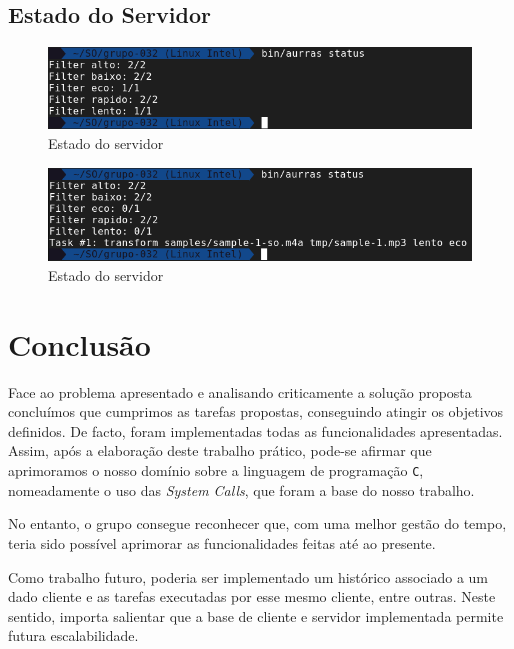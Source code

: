 \documentclass[a4paper, 11pt]{article}
\begin{document}
\subsection*{Estado do Servidor}

\begin{figure}[H]
    \centering
    \includegraphics[width=.8\textwidth]{img/status_1.png}
    \caption{Estado do servidor}
\end{figure}

\begin{figure}[H]
    \centering
    \includegraphics[width=.8\textwidth]{img/status_2.png}
    \caption{Estado do servidor}
\end{figure}

\pagebreak

\section{Conclusão}
\label{sec:conclusao}

Face ao problema apresentado e analisando criticamente a solução proposta concluímos que 
cumprimos as tarefas propostas, conseguindo atingir os objetivos definidos. De facto, foram 
implementadas todas as funcionalidades apresentadas. Assim, após a elaboração deste trabalho 
prático, pode-se afirmar que aprimoramos o nosso domínio sobre a linguagem de programação 
\texttt{C}, nomeadamente o uso das \textit{System Calls}, que foram a base do nosso trabalho.

No entanto, o grupo consegue reconhecer que, com uma melhor gestão do tempo, teria sido possível 
aprimorar as funcionalidades feitas até ao presente.

Como trabalho futuro, poderia ser implementado um histórico associado a um dado cliente e as 
tarefas executadas por esse mesmo cliente, entre outras. Neste sentido, importa salientar que a 
base de cliente e servidor implementada permite futura
escalabilidade.

\clearpage


\printnomenclature
\end{document}
